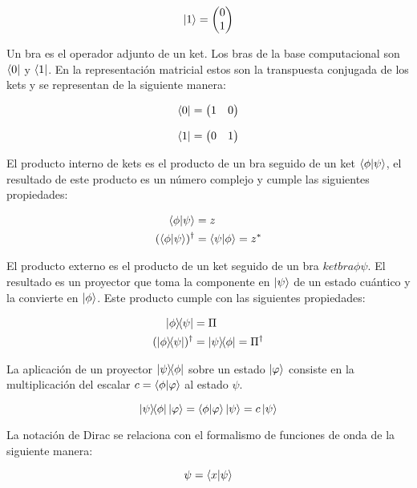 \[\ket{1} = \begin{pmatrix} 0 \\ 1 \end{pmatrix}\]

Un bra es el operador adjunto de un ket. Los bras de la base computacional son $\bra{0}$ y $\bra{1}$. En la representación matricial estos son la transpuesta conjugada de los kets y se representan de la siguiente manera:

\[\bra{0} = \begin{pmatrix} 1 & 0 \end{pmatrix}\]

\[\bra{1} = \begin{pmatrix} 0 & 1 \end{pmatrix}\]

El producto interno de kets es el producto de un bra seguido de un ket $\braket{\phi}{\psi}$, el resultado de este producto es un número complejo y cumple las siguientes propiedades:

\begin{align}
    \braket{\phi}{\psi} &= z \\
    (\braket{\phi}{\psi})^\dagger &= \braket{\psi}{\phi} = z^*
\end{align}

El producto externo es el producto de un ket seguido de un bra $ketbra{\phi}{\psi}$. El resultado es un proyector que toma la componente en $\ket{\psi}$ de un estado cuántico y la convierte en $\ket{\phi}$. Este producto cumple con las siguientes propiedades:

\begin{align}
    \ketbra{\phi}{\psi} &= \Pi \\
    (\ketbra{\phi}{\psi})^\dagger &= \ketbra{\psi}{\phi} = \Pi^\dagger
\end{align}

La aplicación de un proyector $\ketbra{\psi}{\phi}$ sobre un estado $\ket{\varphi}$ consiste en la multiplicación del escalar $c = \braket{\phi}{\varphi}$ al estado $\psi$.

\begin{equation}
    \ketbra{\psi}{\phi} \ket{\varphi} = \braket{\phi}{\varphi} \ket{\psi} = c \ket{\psi}
\end{equation}

La notación de Dirac se relaciona con el formalismo de funciones de onda de la siguiente manera:

\begin{equation}
    \psi = \braket{x}{\psi}
\end{equation}

